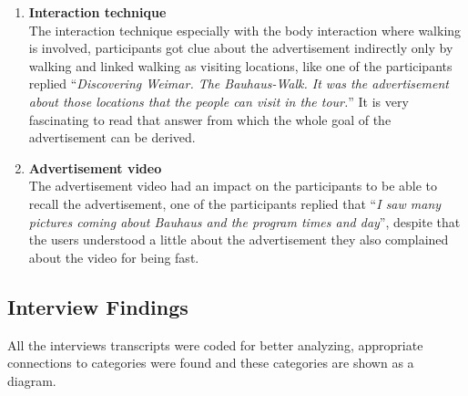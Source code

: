 \begin{itemize}
\begin{enumerate}
\item	\textbf{Interaction technique} \\
The interaction technique especially with the body interaction where walking is involved, participants got clue about the advertisement indirectly only by walking and linked walking as visiting locations, like one of the participants replied ``\emph{Discovering Weimar. The Bauhaus-Walk. It was the advertisement about those locations that the people can visit in the tour.}'' It is very fascinating to read that answer from which the whole goal of the advertisement can be derived.

\item	\textbf{Advertisement video} \\
The advertisement video had an impact on the participants to be able to recall the advertisement, one of the participants replied that ``\emph{I saw many pictures coming about Bauhaus and the program times and day}'', despite that the users understood a little about the advertisement they also complained about the video for being fast.

\end{enumerate}

\end{itemize}

\subsection{Interview Findings}
All the interviews transcripts were coded for better analyzing, appropriate connections to categories were found and these categories are shown as a diagram.

